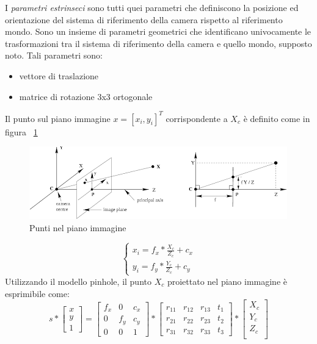 I \emph{parametri estrinseci} sono tutti quei parametri che definiscono la posizione ed orientazione del sistema di riferimento della camera rispetto al riferimento mondo. Sono un insieme di parametri geometrici che identificano univocamente le trasformazioni tra il sistema di riferimento della camera e quello mondo, supposto noto. Tali parametri sono:
\begin{itemize}
\item vettore di traslazione
\item matrice di rotazione 3x3 ortogonale
\end{itemize}
Il punto sul piano immagine $x = [x_i,y_i]^T$ corrispondente a $X_c$ è definito come in figura ~\ref{fig:images_point} 
\begin{figure}[H]
   \centering
   \includegraphics[width=1\columnwidth]{images_point.png} 
   \caption{Punti nel piano immagine}
   \label{fig:images_point} 
\end{figure}
\begin{equation}
\begin{cases}
x_i = f_x * \frac{X_c}{Z_c}	+ c_x\\	
y_i = f_y* \frac{Y_c}{Z_c} + c_y
 \end{cases}
\label{eq:punto_immagine}
\end{equation}
Utilizzando il modello pinhole, il punto $X_c$ proiettato nel piano immagine è esprimibile come:
\begin{equation}
 s* \begin{bmatrix}
    x  \\
    y \\
    1
  \end{bmatrix} = \begin{bmatrix}
    f_x & 0&c_x  \\
    0&f_y&c_y \\
    0&0&1
  \end{bmatrix} * \begin{bmatrix}
  r_{11} & r_{12} & r_{13} & t_1 \\
  r_{21} & r_{22} & r_{23} & t_2	\\
  r_{31} & r_{32} & r_{33} & t_{3}
  \end{bmatrix} *\begin{bmatrix}
    X_c  \\
    Y_c \\
    Z_c \\
  \end{bmatrix}
\label{eq:punto omogeneo}
\end{equation}
